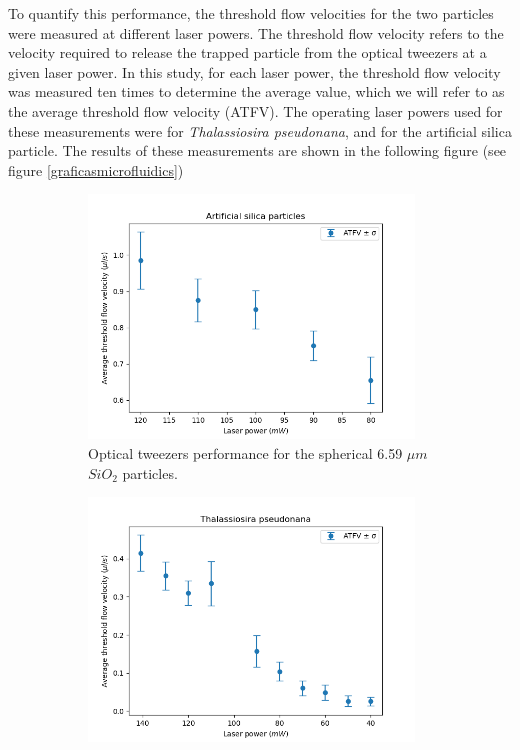 \documentclass[letterpaper,12pt,oneside]{book}
\begin{document}
\noindent
To quantify this performance, the threshold flow velocities for the two particles were measured at different laser powers. The threshold flow velocity refers to the velocity required to release the trapped particle from the optical tweezers at a given laser power. In this study, for each laser power, the threshold flow velocity was measured ten times to determine the average value, which we will refer to as the average threshold flow velocity (ATFV). The operating laser powers used for these measurements were  for \textit{Thalassiosira pseudonana}, and  for the artificial silica particle.
The results of these measurements are shown in the following figure (see figure \ref{graficasmicrofluidics})
\begin{figure}[H]
     \centering
     \begin{subfigure}[b]{0.49\textwidth}
         \centering
         \includegraphics[width=0.95\textwidth]{Newplots_microfluidics_results/Silica_particles.png}
         \caption{Optical tweezers performance for the spherical 6.59 $\mu m$ $SiO_2$ particles.}
         \label{fig:y equals x}
     \end{subfigure}
     \hfill
     \begin{subfigure}[b]{0.49\textwidth}
         \centering
         \includegraphics[width=0.95\textwidth]{Newplots_microfluidics_results/Thala.png}

\end{subfigure}
\end{figure}
\end{document}
